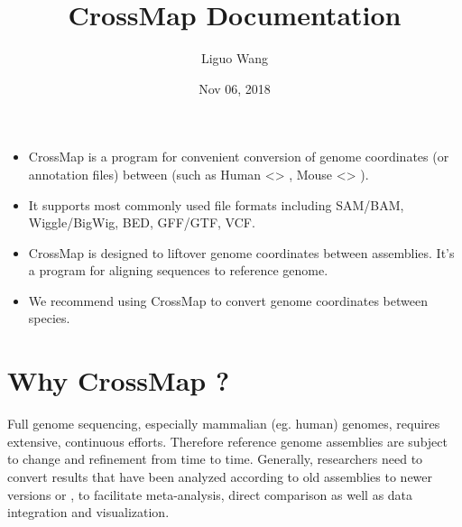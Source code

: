 \documentclass[letterpaper,10pt,english]{sphinxmanual}
\title{CrossMap Documentation}
\date{Nov 06, 2018}
\author{Liguo Wang}
\let\sphinxpxdimen\pdfpxdimen\else\newdimen\sphinxpxdimen
\begin{document}
\maketitle
\sphinxtableofcontents
{}\label{\detokenize{index::doc}}
\noindent\scalebox{0.500000}{\sphinxincludegraphics[width=750\sphinxpxdimen,height=150\sphinxpxdimen]{{logo}.png}}


\begin{itemize}
\item {} 
CrossMap is a program for convenient conversion of genome coordinates (or annotation files)
between  (such as Human 
\textless{}\textgreater{} , Mouse 
\textless{}\textgreater{} ).

\item {} 
It supports most commonly used file formats including SAM/BAM, Wiggle/BigWig, BED, GFF/GTF, VCF.

\item {} 
CrossMap is designed to liftover genome coordinates between assemblies. It's  a program
for aligning sequences to reference genome.

\item {} 
We  recommend using CrossMap to convert genome coordinates between species.

\end{itemize}


\chapter{Why CrossMap ?}
\label{\detokenize{index:what-is-crossmap}}\label{\detokenize{index:why-crossmap}}
Full genome sequencing, especially mammalian (eg. human) genomes, requires extensive, continuous
efforts. Therefore reference genome assemblies are subject to change and refinement from time
to time. Generally, researchers need to convert results that have been analyzed according to
old assemblies to newer versions or ,  to facilitate meta-analysis, direct comparison
as well as data integration and visualization.
\end{document}
